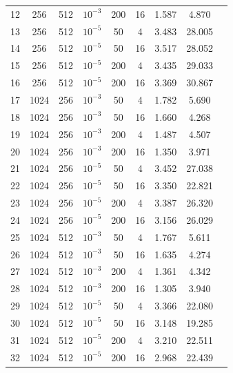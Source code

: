 \documentclass{automatextcc}
\begin{document}
\begin{table}
{\begin{tabular}[t]{ccccccccc}
        12 & 256 & 512 & $10^{-3}$ & 200 & 16 & 1.587 & 4.870 \\
        13 & 256 & 512 & $10^{-5}$ & 50 & 4 & 3.483 & 28.005 \\
        14 & 256 & 512 & $10^{-5}$ & 50 & 16 & 3.517 & 28.052 \\
        15 & 256 & 512 & $10^{-5}$ & 200 & 4 & 3.435 & 29.033 \\
        16 & 256 & 512 & $10^{-5}$ & 200 & 16 & 3.369 & 30.867 \\
        17 & 1024 & 256 & $10^{-3}$ & 50 & 4 & 1.782 & 5.690 \\
        18 & 1024 & 256 & $10^{-3}$ & 50 & 16 & 1.660 & 4.268 \\
        19 & 1024 & 256 & $10^{-3}$ & 200 & 4 & 1.487 & 4.507 \\
        20 & 1024 & 256 & $10^{-3}$ & 200 & 16 & 1.350 & 3.971 \\
        21 & 1024 & 256 & $10^{-5}$ & 50 & 4 & 3.452 & 27.038 \\
        22 & 1024 & 256 & $10^{-5}$ & 50 & 16 & 3.350 & 22.821 \\
        23 & 1024 & 256 & $10^{-5}$ & 200 & 4 & 3.387 & 26.320 \\
        24 & 1024 & 256 & $10^{-5}$ & 200 & 16 & 3.156 & 26.029 \\
        25 & 1024 & 512 & $10^{-3}$ & 50 & 4 & 1.767 & 5.611 \\
        26 & 1024 & 512 & $10^{-3}$ & 50 & 16 & 1.635 & 4.274 \\
        27 & 1024 & 512 & $10^{-3}$ & 200 & 4 & 1.361 & 4.342 \\
        28 & 1024 & 512 & $10^{-3}$ & 200 & 16 & 1.305 & 3.940 \\
        29 & 1024 & 512 & $10^{-5}$ & 50 & 4 & 3.366 & 22.080 \\
        30 & 1024 & 512 & $10^{-5}$ & 50 & 16 & 3.148 & 19.285 \\
        31 & 1024 & 512 & $10^{-5}$ & 200 & 4 & 3.210 & 22.511 \\
        32 & 1024 & 512 & $10^{-5}$ & 200 & 16 & 2.968 & 22.439 \\
        \bottomrule
        \end{tabular}
    }
\end{table}
\end{document}
